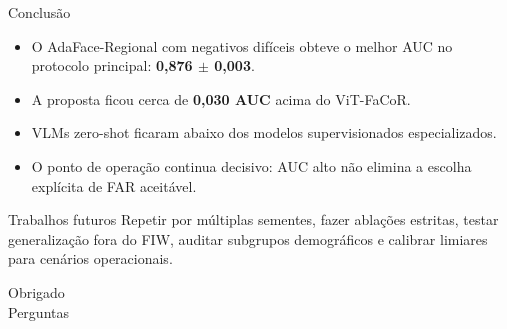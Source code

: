 \documentclass[aspectratio=169,10pt]{beamer}
\newcommand{\highlight}[1]{\textcolor{cefetblue}{\textbf{#1}}}
\begin{document}
\begin{frame}{Conclusão}
  \begin{itemize}
    \item O AdaFace-Regional com negativos difíceis obteve o melhor AUC no protocolo principal: \highlight{0,876 $\pm$ 0,003}.
    \item A proposta ficou cerca de \highlight{0,030 AUC} acima do ViT-FaCoR.
    \item VLMs zero-shot ficaram abaixo dos modelos supervisionados especializados.
    \item O ponto de operação continua decisivo: AUC alto não elimina a escolha explícita de FAR aceitável.
  \end{itemize}

  \vspace{0.5cm}
  \begin{block}{Trabalhos futuros}
    Repetir por múltiplas sementes, fazer ablações estritas, testar generalização fora do FIW, auditar subgrupos demográficos e calibrar limiares para cenários operacionais.
  \end{block}
\end{frame}

\begin{frame}
  \centering
  \vspace{1.0cm}
  {\Huge Obrigado}\\[0.7cm]
  {\Large Perguntas}
\end{frame}
\end{document}
